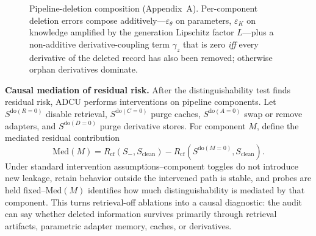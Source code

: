 \documentclass[10pt,journal,compsoc]{IEEEtran}
\newcommand{\method}{ADCU}
\begin{document}
\begin{figure}[t]
\centering
{}
\caption{Pipeline-deletion composition (Appendix~A). Per-component deletion errors compose additively---$\varepsilon_\theta$ on parameters, $\varepsilon_K$ on knowledge amplified by the generation Lipschitz factor $L$---plus a non-additive derivative-coupling term $\gamma_z$ that is zero \emph{iff} every derivative of the deleted record has also been removed; otherwise orphan derivatives dominate.}
\label{fig:composition}
\end{figure}

\textbf{Causal mediation of residual risk.}
After the distinguishability test finds residual risk, \method{} performs interventions on pipeline components. Let $S^{\mathrm{do}(R=0)}$ disable retrieval, $S^{\mathrm{do}(C=0)}$ purge caches, $S^{\mathrm{do}(A=0)}$ swap or remove adapters, and $S^{\mathrm{do}(D=0)}$ purge derivative stores. For component $M$, define the mediated residual contribution
\[
\mathrm{Med}(M)=
R_{\mathrm{cf}}(S_-,S_{\mathrm{clean}})
-
R_{\mathrm{cf}}(S^{\mathrm{do}(M=0)},S_{\mathrm{clean}}).
\]
Under standard intervention assumptions--component toggles do not introduce new leakage, retain behavior outside the intervened path is stable, and probes are held fixed--$\mathrm{Med}(M)$ identifies how much distinguishability is mediated by that component. This turns retrieval-off ablations into a causal diagnostic: the audit can say whether deleted information survives primarily through retrieval artifacts, parametric adapter memory, caches, or derivatives.
\end{document}
